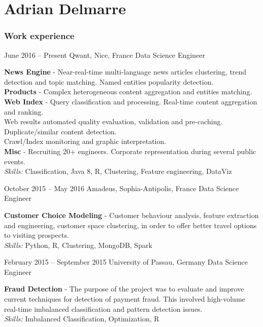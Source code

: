 \documentclass{tccv}
\renewcommand{\it}{\textit}
\renewcommand{\bf}{\textbf}
\begin{document}
\part{Adrian Delmarre}

\section{Work experience}

\begin{eventlist}

\item{June 2016 -- Present}
    {Qwant, Nice, France}
    {Data Science Engineer}

\bf{News Engine} - Near-real-time multi-language news articles clustering, trend detection and topic matching. Named entities popularity detection.\\
\bf{Products} - Complex heterogeneous content aggregation and entities matching.\\
\bf{Web Index} - Query classification and processing. Real-time content aggregation and ranking.\\
Web results automated quality evaluation, validation and pre-caching.\\
Duplicate/similar content detection.\\
Crawl/Index monitoring and graphic interpretation.\\
\bf{Misc} - Recruiting 20+ engineers. Corporate representation during several public events.\\
\it{Skills:} Classification, Java 8, R, Clustering, Feature engineering, DataViz

\item{October 2015 -- May 2016}
    {Amadeus, Sophia-Antipolis, France}
    {Data Science Engineer}

\bf{Customer Choice Modeling} - Customer behaviour analysis, feature extraction and engineering, customer space clustering, in order to offer better travel options to visiting prospects.\\
\it{Skills:} Python, R, Clustering, MongoDB, Spark

\item{February 2015 -- September 2015}
    {University of Passau, Germany}
    {Data Science Engineer}

\bf{Fraud Detection} - The purpose of the project was to evaluate and improve current techniques for detection of payment fraud. This involved high-volume real-time imbalanced classification and pattern detection issues.\\
\it{Skills:} Imbalanced Classification, Optimization, R


\end{eventlist}
\end{document}
